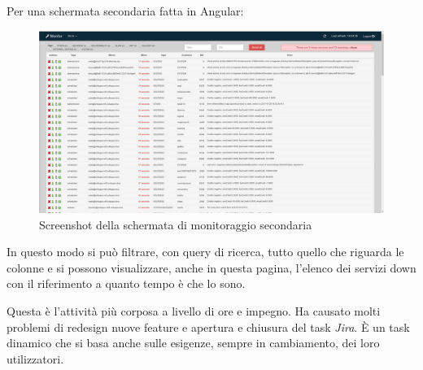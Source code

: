 \documentclass[a4paper]{article}
\begin{document}
Per una schermata secondaria fatta in Angular:
\begin{figure}[H]
	\includegraphics[width=\textwidth]{issue_new.png}
	\centering
	\caption{Screenshot della schermata di monitoraggio secondaria}
\end{figure}
\par In questo modo si può filtrare, con query di ricerca, tutto quello che riguarda le colonne
e si possono visualizzare, anche in questa pagina, l'elenco dei servizi down con il 
riferimento a quanto tempo è che lo sono. 
\par Questa è l'attività più corposa a livello di ore e impegno. Ha causato molti problemi di 
redesign nuove feature e apertura e chiusura del task \emph{Jira}. È un task dinamico
che si basa anche sulle esigenze, sempre in cambiamento, dei loro utilizzatori.
\end{document}

